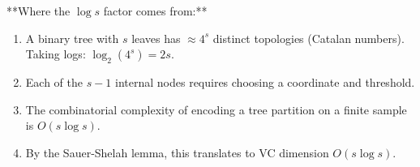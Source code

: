 **Where the $\log s$ factor comes from:**
\begin{enumerate}
\item A binary tree with $s$ leaves has $\approx 4^s$ distinct topologies (Catalan numbers). Taking logs: $\log_2(4^s) = 2s$.
\item Each of the $s-1$ internal nodes requires choosing a coordinate and threshold.
\item The combinatorial complexity of encoding a tree partition on a finite sample is $O(s \log s)$.
\item By the Sauer-Shelah lemma, this translates to VC dimension $O(s \log s)$.
\end{enumerate}
